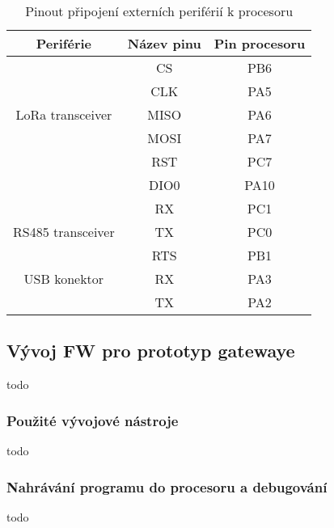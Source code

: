 \begin{table}[h]
    \centering
    \begin{ctucolortab}
            \begin{tabular}{ |c|c|c| }
     \hline

     Periférie          & Název pinu & Pin procesoru           \\ \hline \hline

                        & CS    &  PB6             \\
                        & CLK   &  PA5        \\
    LoRa transceiver    & MISO  &  PA6     \\
                        & MOSI  &  PA7        \\
                        & RST   & PC7          \\
                        & DIO0  & PA10         \\
                        \hline
     
                        & RX  &   PC1            \\
    RS485 transceiver   & TX  &   PC0       \\
                        & RTS  &  PB1      \\     \hline

    USB konektor        & RX    & PA3    \\
                        & TX    & PA2   \\          \hline

    \end{tabular}
    \end{ctucolortab}
    \caption{Pinout připojení externích periférií k procesoru}
    \label{table:3}
\end{table}


\subsection{Vývoj FW pro prototyp gatewaye}
todo

\subsubsection{Použité vývojové nástroje}
todo

\subsubsection{Nahrávání programu do procesoru a debugování}
todo



